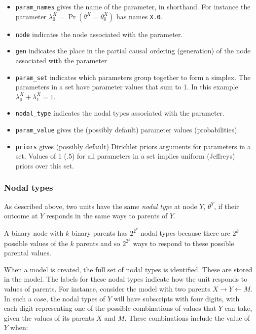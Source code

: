 \documentclass[
  11pt,
  article]{jss}
\providecommand{\tightlist}{%
  \setlength{\itemsep}{0pt}\setlength{\parskip}{0pt}}\usepackage{longtable,booktabs,array}
\begin{document}
\begin{itemize}
\tightlist
\item
  \texttt{param\_names} gives the name of the parameter, in shorthand.
  For instance the parameter
  \(\lambda^X_0 = \Pr(\theta^X = \theta^X_0)\) has names \texttt{X.0}.
\item
  \texttt{node} indicates the node associated with the parameter.
\item
  \texttt{gen} indicates the place in the partial causal ordering
  (generation) of the node associated with the parameter
\item
  \texttt{param\_set} indicates which parameters group together to form
  a simplex. The parameters in a set have parameter values that sum to
  1. In this example \(\lambda^X_0 + \lambda^X_1 = 1\).
\item
  \texttt{nodal\_type} indicates the nodal types associated with the
  parameter.
\item
  \texttt{param\_value} gives the (possibly default) parameter values
  (probabilities).
\item
  \texttt{priors} gives (possibly default) Dirichlet priors arguments
  for parameters in a set. Values of 1 (.5) for all parameters in a set
  implies uniform (Jeffreys) priors over this set.
\end{itemize}

\hypertarget{sec-nodal-types}{%
\subsubsection{Nodal types}\label{sec-nodal-types}}

As described above, two units have the same \emph{nodal type} at node
\(Y\), \(\theta^Y\), if their outcome at \(Y\) responds in the same ways
to parents of \(Y\).

A binary node with \(k\) binary parents has \(2^{2^k}\) nodal types
because there are \(2^k\) possible values of the \(k\) parents and so
\(2^{2^k}\) ways to respond to these possible parental values.

When a model is created, the full set of nodal types is identified.
These are stored in the model. The labels for these nodal types indicate
how the unit responds to values of parents. For instance, consider the
model with two parents \(X \rightarrow Y \leftarrow M.\) In such a case,
the nodal types of \(Y\) will have subscripts with four digits, with
each digit representing one of the possible combinations of values that
\(Y\) can take, given the values of its parents \(X\) and \(M.\) These
combinations include the value of \(Y\) when:
\end{document}
